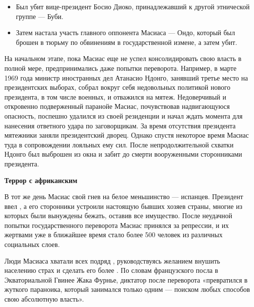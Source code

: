 \begin{itemize}
    \item Был убит вице-президент Босио Диоко, принадлежавший к другой этнической группе --- Буби.
    \item Затем настала участь главного оппонента Масиаса --- Ондо, который был брошен в тюрьму по обвинениям в государственной измене, а затем убит.
\end{itemize}

На начальном этапе, пока Масиас еще не успел консолидировать свою власть в полной мере, предпринимались даже попытки переворота. Например, в марте 1969 года министр иностранных дел Атанасио Ндонго, занявший третье место на президентских выборах, собрал вокруг себя недовольных политикой нового президента, в том числе военных, и отважился на мятеж. Недоверчивый и откровенно подверженный паранойе Масиас, почувствовав надвигающуюся опасность, поспешно удалился из своей резиденции и начал ждать момента для нанесения ответного удара по заговорщикам. За время отсутствия президента мятежники заняли президентский дворец. Однако спустя некоторое время Масиас  туда в сопровождении лояльных ему сил. После непродолжительной схватки Ндонго был выброшен из окна и забит до смерти вооруженными сторонниками президента.


\textbf{Террор с африканским }

В тот же день Масиас  свой гнев на белое меньшинство --- испанцев. Президент ввел , а его сторонники устроили настоящую  бывших хозяев страны, многие из которых были вынуждены бежать, оставив все имущество. После неудачной попытки государственного переворота Масиас принялся за репрессии, и их жертвами уже в ближайшее время стало более 500 человек из различных социальных слоев.

\begin{fancyquotes}
    Люди Масиаса хватали всех подряд , руководствуясь желанием внушить населению страх и сделать его более . По словам французского посла в Экваториальной Гвинее Жака Фурнье, диктатор после переворота «превратился в жуткого параноика, который занимался только одним --- поиском любых способов  свою абсолютную власть».
\end{fancyquotes}

